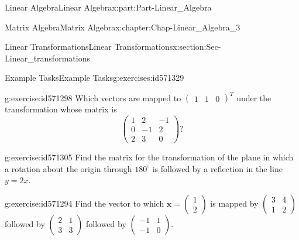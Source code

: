 \documentclass[oneside,10pt,]{book}
\numberwithin{equation}{section}
\newcommand{\amp}{&}
\begin{document}
\begin{partptx}{Linear Algebra}{}{Linear Algebra}{}{}{x:part:Part-Linear_Algebra}
\begin{chapterptx}{Matrix Algebra}{}{Matrix Algebra}{}{}{x:chapter:Chap-Linear_Algebra_3}
\begin{sectionptx}{Linear Transformations}{}{Linear Transformations}{}{}{x:section:Sec-Linear_transformations}
%
%
\typeout{************************************************}
\typeout{************************************************}
%
\begin{exercises-subsection-numberless}{Example Tasks}{}{Example Tasks}{}{}{g:exercises:id571329}
\begin{divisionexercise}{1}{}{}{g:exercise:id571298}%
Which vectors are mapped to \(\begin{pmatrix} 1 \amp 1 \amp 0 \end{pmatrix}^T\) under the transformation whose matrix is%
\begin{equation*}
\begin{pmatrix} 1 \amp 2 \amp -1 \\ 0 \amp -1 \amp 2 \\ 2 \amp 3 \amp 0 \end{pmatrix} \text{?}
\end{equation*}
%
\end{divisionexercise}%
\begin{divisionexercise}{2}{}{}{g:exercise:id571305}%
Find the matrix for the transformation of the plane in which a rotation about the origin through \(180^{\circ}\) is followed by a reflection in the line \(y = 2x\).%
\end{divisionexercise}%
\begin{divisionexercise}{3}{}{}{g:exercise:id571294}%
Find the vector to which \(\mathbf{x} = \begin{pmatrix}1 \\ 2\end{pmatrix}\) is mapped by \(\begin{pmatrix} 3 \amp 4 \\ 1 \amp 2 \end{pmatrix}\) followed by \(\begin{pmatrix}2 \amp 1 \\ 3 \amp 3 \end{pmatrix}\) followed by \(\begin{pmatrix}-1 \amp 1 \\ -1 \amp 0\end{pmatrix}.\)%
\end{divisionexercise}%
\end{exercises-subsection-numberless}
\end{sectionptx}
\end{chapterptx}
%
\typeout{************************************************}
\typeout{************************************************}

\end{partptx}
\end{document}
